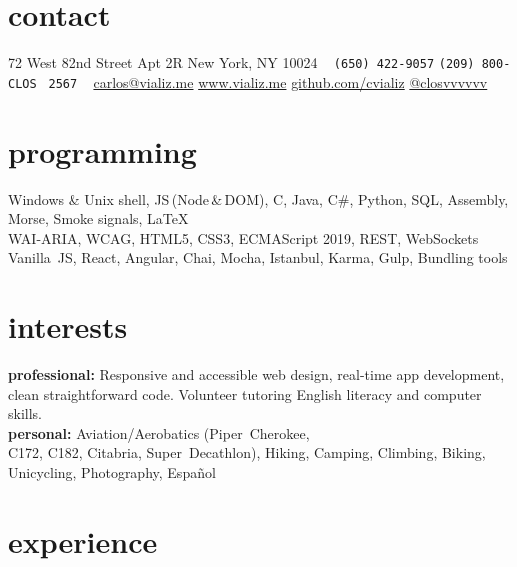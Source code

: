 \documentclass[]{cv-style}          %
\begin{document}
\lastupdated


\begin{aside}
%
\section{contact}
72 West 82nd Street
Apt 2R
New York, NY 10024
~
\texttt{\color{gray}(650) 422-9057}
\texttt{\color{gray}(209) 800-CLOS}
\texttt{\color{gray}          2567}
~
\href{mailto:carlos@vializ.me}{carlos@vializ.me}
\href{https://www.vializ.me}{www.vializ.me}
\href{https://www.github.com/cvializ}{github.com/cvializ}
\href{https://www.twitter.com/closvvvvvv}{@closvvvvvv}
%
\section{programming}
Windows \& Unix shell, JS\,(Node\,\&\,DOM), C, Java, C\#, Python, SQL, Assembly, Morse, Smoke signals, \LaTeX{}%
\\[\baselineskip]%
WAI-ARIA, WCAG, HTML5, CSS3, ECMAScript 2019, REST, WebSockets %
\\[\baselineskip]%
{Vanilla~JS}, React, Angular, Chai, Mocha, Istanbul, Karma, Gulp, Bundling tools%
%
\section{interests}
\textbf{professional:} Responsive and accessible web design, real-time app development, clean straightforward code. Volunteer tutoring English literacy and computer skills.\\[\baselineskip]%
\textbf{personal:} Aviation/Aerobatics ({Piper~Cherokee},\\{C172}, C182, Citabria, {Super~Decathlon}), Hiking, Camping, Climbing, Biking, Unicycling, Photography, Español
%
\end{aside}


\section{experience}
\end{document}
